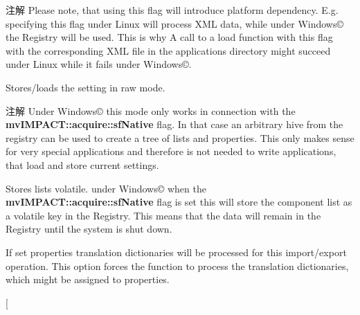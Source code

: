 \begin{Desc}
\begin{description}
\begin{DoxyNote}{注解}
Please note, that using this flag will introduce platform dependency. E.\+g. specifying this flag under Linux will process X\+M\+L data, while under Windows\copyright{} the Registry will be used. This is why A call to a load function with this flag with the corresponding X\+M\+L file in the applications directory might succeed under Linux while it fails under Windows\copyright{}. 
\end{DoxyNote}
\item[{\em 
\hypertarget{group___common_interface_gga9390ccf3b2ebe68eee998798d59dc823a06c34f2107e329e641ecfd7f2a6d1621}{sf\+Raw}\label{group___common_interface_gga9390ccf3b2ebe68eee998798d59dc823a06c34f2107e329e641ecfd7f2a6d1621}
}]Stores/loads the setting in raw mode. \begin{DoxyNote}{注解}
Under Windows\copyright{} this mode only works in connection with the {\bfseries mv\+I\+M\+P\+A\+C\+T\+::acquire\+::sf\+Native} flag. In that case an arbitrary hive from the registry can be used to create a tree of lists and properties. This only makes sense for very special applications and therefore is not needed to write applications, that load and store current settings. 
\end{DoxyNote}
\item[{\em 
\hypertarget{group___common_interface_gga9390ccf3b2ebe68eee998798d59dc823a3afddc52644526c93a1d91572c55b5ef}{sf\+Volatile}\label{group___common_interface_gga9390ccf3b2ebe68eee998798d59dc823a3afddc52644526c93a1d91572c55b5ef}
}]Stores lists volatile. under Windows\copyright{} when the {\bfseries mv\+I\+M\+P\+A\+C\+T\+::acquire\+::sf\+Native} flag is set this will store the component list as a volatile key in the Registry. This means that the data will remain in the Registry until the system is shut down. \item[{\em 
\hypertarget{group___common_interface_gga9390ccf3b2ebe68eee998798d59dc823af1cf2b2b67b58575a2431a02825a3396}{sf\+Process\+Prop\+Translation\+Dict}\label{group___common_interface_gga9390ccf3b2ebe68eee998798d59dc823af1cf2b2b67b58575a2431a02825a3396}
}]If set properties translation dictionaries will be processed for this import/export operation. This option forces the function to process the translation dictionaries, which might be assigned to properties. \item[{\em 
}
\end{description}
\end{Desc}
